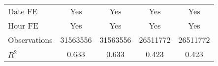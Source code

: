 {\begin{tabular}{l*{4}{S}}
\addlinespace
Date FE             &       {Yes}         &       {Yes}         &       {Yes}         &       {Yes}         \\
\addlinespace
Hour FE             &       {Yes}         &       {Yes}         &       {Yes}         &       {Yes}         \\
\midrule
Observations        &\num{31563556}         &\num{31563556}         &\num{26511772}         &\num{26511772}         \\
$R^2$             &     {0.633}         &     {0.633}         &     {0.423}         &     {0.423}         \\
\bottomrule
\end{tabular}
}
